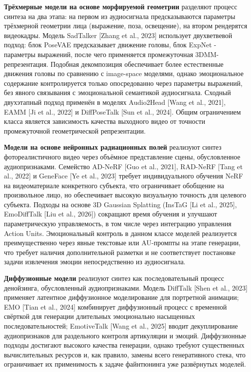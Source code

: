 \documentclass[a4paper, 12pt, oneside, openany]{article}
\begin{document}
\textbf{Трёхмерные модели на основе морфируемой геометрии} разделяют процесс синтеза на два этапа: на первом из аудиосигнала предсказываются параметры трёхмерной геометрии лица (выражение, поза, освещение), на втором рендерятся видеокадры. Модель SadTalker [Zhang et al., 2023] использует двухветвевой подход: блок PoseVAE предсказывает движение головы, блок ExpNet - параметры выражений, после чего применяется промежуточная 3DMM-репрезентация. Подобная декомпозиция обеспечивает более естественные движения головы по сравнению с image-space моделями, однако эмоциональное содержание контролируется только опосредованно через параметры выражений, без явного связывания с эмоциональной семантикой аудиосигнала. Сходный двухэтапный подход применён в моделях Audio2Head [Wang et al., 2021], EAMM [Ji et al., 2022] и DiffPoseTalk [Sun et al., 2024]. Общим ограничением класса является зависимость качества выходного видео от точности промежуточной геометрической репрезентации.

\textbf{Модели на основе нейронных радиационных полей} реализуют синтез фотореалистичного видео через объёмное представление сцены, обусловленное аудиопризнаками. Семейство AD-NeRF [Guo et al., 2021], RAD-NeRF [Tang et al., 2022] и GeneFace [Ye et al., 2023] требует индивидуального обучения NeRF на видеоматериале конкретного субъекта, что ограничивает обобщение на произвольное лицо, но обеспечивает высокую визуальную точность для целевого субъекта. Подходы на основе 3D Gaussian Splatting (InsTaG [Li et al., 2025], EmoDiffTalk [Liu et al., 2026]) сокращают время обучения и улучшают параметрическую управляемость, в том числе через интеграцию управления Action Units. Эмоциональный контроль в данном классе моделей реализуется преимущественно через явные текстовые или AU-промпты на этапе генерации, что требует наличия дополнительной разметки и не соответствует постановке задачи извлечения эмоции непосредственно из аудиосигнала.

\textbf{Диффузионные модели} реализуют синтез как последовательный процесс денойзинга, обусловленный аудиопризнаками. Модель DiffTalk [Shen et al., 2023] применяет латентное диффузионное моделирование для портретной анимации; EMO [Tian et al., 2024] комбинирует диффузионный процесс с временной свёрткой для генерации длительных эмоционально насыщенных последовательностей; EmotiveTalk [Wang et al., 2025] вводит декуплирование аудиопризнаков для раздельного контроля артикуляции и эмоций. Диффузионные подходы достигают высокого качества генерации, однако требуют существенных вычислительных ресурсов и, как правило, замены всего генеративного стека, что ограничивает их применимость к задаче файнтюнинга уже развёрнутых моделей.
\end{document}
